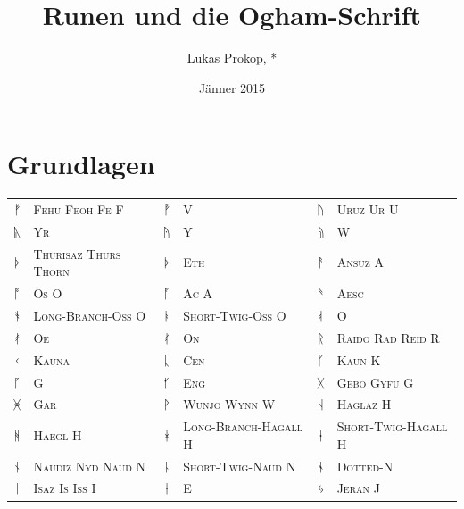 \documentclass[a4paper]{scrartcl}
\author{Lukas Prokop, *}
\title{Runen und die Ogham-Schrift}
\date{Jänner 2015}
\begin{document}
\maketitle
\tableofcontents

\section{Grundlagen}

\begin{table}[p]
  \small
  \begin{center}
    \begin{tabular}{clclcl}
      {\runicfont ᚠ} & \textsc{Fehu Feoh Fe F} &
      {\runicfont ᚡ} & \textsc{V} &
      {\runicfont ᚢ} & \textsc{Uruz Ur U} \\
      {\runicfont ᚣ} & \textsc{Yr} &
      {\runicfont ᚤ} & \textsc{Y} &
      {\runicfont ᚥ} & \textsc{W} \\
      {\runicfont ᚦ} & \textsc{Thurisaz Thurs Thorn} &
      {\runicfont ᚧ} & \textsc{Eth} &
      {\runicfont ᚨ} & \textsc{Ansuz A} \\
      {\runicfont ᚩ} & \textsc{Os O} &
      {\runicfont ᚪ} & \textsc{Ac A} &
      {\runicfont ᚫ} & \textsc{Aesc} \\
      {\runicfont ᚬ} & \textsc{Long-Branch-Oss O} &
      {\runicfont ᚭ} & \textsc{Short-Twig-Oss O} &
      {\runicfont ᚮ} & \textsc{O} \\
      {\runicfont ᚯ} & \textsc{Oe} &
      {\runicfont ᚰ} & \textsc{On} &
      {\runicfont ᚱ} & \textsc{Raido Rad Reid R} \\
      {\runicfont ᚲ} & \textsc{Kauna} &
      {\runicfont ᚳ} & \textsc{Cen} &
      {\runicfont ᚴ} & \textsc{Kaun K} \\
      {\runicfont ᚵ} & \textsc{G} &
      {\runicfont ᚶ} & \textsc{Eng} &
      {\runicfont ᚷ} & \textsc{Gebo Gyfu G} \\
      {\runicfont ᚸ} & \textsc{Gar} &
      {\runicfont ᚹ} & \textsc{Wunjo Wynn W} &
      {\runicfont ᚺ} & \textsc{Haglaz H} \\
      {\runicfont ᚻ} & \textsc{Haegl H} &
      {\runicfont ᚼ} & \textsc{Long-Branch-Hagall H} &
      {\runicfont ᚽ} & \textsc{Short-Twig-Hagall H} \\
      {\runicfont ᚾ} & \textsc{Naudiz Nyd Naud N} &
      {\runicfont ᚿ} & \textsc{Short-Twig-Naud N} &
      {\runicfont ᛀ} & \textsc{Dotted-N} \\
      {\runicfont ᛁ} & \textsc{Isaz Is Iss I} &
      {\runicfont ᛂ} & \textsc{E} &
      {\runicfont ᛃ} & \textsc{Jeran J} \\

\end{tabular}
\end{center}
\end{table}
\end{document}
